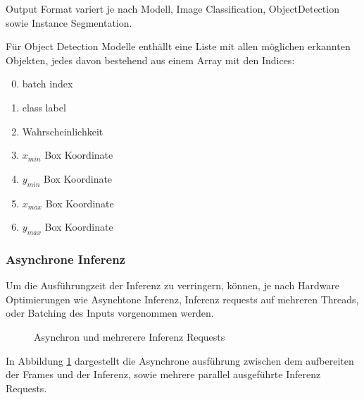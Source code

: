 
Output Format variert je nach Modell, Image Classification,
ObjectDetection sowie Instance Segmentation.


Für Object Detection Modelle 
enthällt eine Liste mit allen möglichen erkannten Objekten, jedes 
davon bestehend aus einem Array mit den Indices:

\begin{enumerate}
    \setcounter{enumi}{-1}
    \item batch index
    \item class label
    \item Wahrscheinlichkeit
    \item $x_{min}$ Box Koordinate
    \item $y_{min}$ Box Koordinate
    \item $x_{max}$ Box Koordinate
    \item $y_{max}$ Box Koordinate
\end{enumerate}


\subsubsection{Asynchrone Inferenz}


Um die Ausführungzeit der Inferenz zu verringern, können, 
je nach Hardware Optimierungen wie Asynchtone Inferenz, 
Inferenz requests auf mehreren Threads, oder Batching des 
Inputs vorgenommen werden.

\begin{figure}[htb]
    \centering
    \def\svgwidth{0.7\textwidth}
    
    \caption{Asynchron und mehrerere Inferenz Requests}
    \label{fig:async}
\end{figure}

In Abbildung \ref{fig:async} dargestellt die Asynchrone ausführung 
zwischen dem aufbereiten der Frames und der Inferenz, sowie 
mehrere parallel ausgeführte Inferenz Requests.


